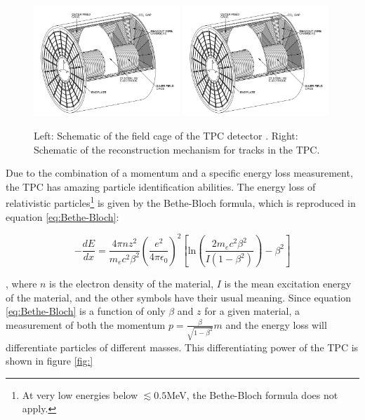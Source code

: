 \begin{figure}
    \centering
    \includegraphics[width=0.49\textwidth]{figures/tpc_cage.png}
    \includegraphics[width=0.49\textwidth]{figures/tpc_cage.png}
    \caption{Left: Schematic of the field cage of the TPC detector \cite{}. Right: Schematic of the reconstruction mechanism for tracks in the TPC.}
    \label{fig:TPC_schemtic}
\end{figure}

Due to the combination of a momentum and a specific energy loss measurement, the TPC has amazing particle identification abilities. The energy loss of relativistic particles\footnote{At very low energies below $\lesssim 0.5 $MeV, the Bethe-Bloch formula does not apply. } is given by the Bethe-Bloch formula, which is reproduced in equation \ref{eq:Bethe-Bloch}:

\begin{equation}\label{eq:Bethe-Bloch}
    -\frac{dE}{dx} = \frac{4\pi n z^2}{m_e c^2 \beta^2} \left( \frac{e^2}{4\pi \epsilon_0}\right)^2 \left[ \mathrm{ln}\left(\frac{2m_ec^2\beta^2}{I(1-\beta^2)}\right)-\beta^2 \right]
\end{equation}

, where $n$ is the electron density of the material, $I$ is the mean excitation energy of the material, and the other symbols have their usual meaning. Since equation \ref{eq:Bethe-Bloch} is a function of only $\beta$ and $z$ for a given material, a measurement of both the momentum $p=\frac{\beta}{\sqrt{1-\beta^2}}m$ and the energy loss will differentiate particles of different masses. This differentiating power of the TPC is shown in figure \ref{fig:}

